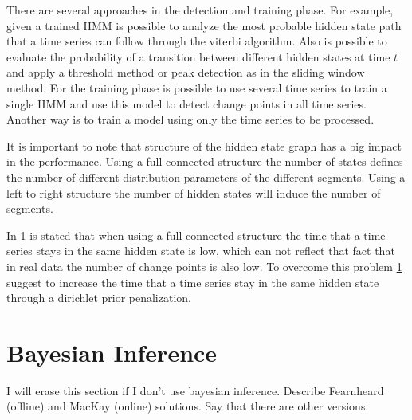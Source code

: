 There are several approaches in the detection and training phase. For example, given a trained HMM is possible to analyze the most probable hidden state path that a time series can follow through the viterbi algorithm. Also is possible to evaluate the probability of a transition between different hidden states at time $t$ and apply a threshold method or peak detection as in the sliding window method. For the training phase is possible to use several time series to train a single HMM and use this model to detect change points in all time series. Another way is to train a model using only the time series to be processed.

It is important to note that structure of the hidden state graph has a big impact in the performance. Using a full connected structure the number of states defines the number of different distribution parameters of the different segments. Using a left to right structure the number of hidden states will induce the number of segments.

In \ref{} is stated that when using a full connected structure the time that a time series stays in the same hidden state is low, which can not reflect that fact that in real data the number of change points is also low. To overcome this problem \ref{} suggest to increase the time that a time series stay in the same hidden state through a dirichlet prior penalization.


\section{Bayesian Inference}
I will erase this section if I don't use bayesian inference. Describe Fearnheard (offline) and MacKay (online) solutions. Say that there are other versions.

